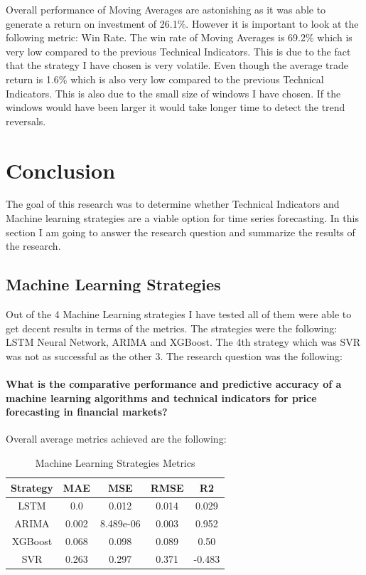 \documentclass{imc-inf}
\begin{document}
				Overall performance of Moving Averages are astonishing as it was able to generate a return on investment of 26.1\%. However it is important to look at the following 
				metric: Win Rate. The win rate of Moving Averages is 69.2\% which is very low compared to the previous Technical Indicators. This is due to the fact that the strategy I have 
				chosen is very volatile. Even though the average trade return is 1.6\% which is also very low compared to the previous Technical Indicators. This is also due to the small size 
				of windows I have chosen. If the windows would have been larger it would take longer time to detect the trend reversals.
	

\chapter{Conclusion}

	The goal of this research was to determine whether Technical Indicators and Machine learning strategies are a viable option for time series forecasting. In this section I am going to answer 
	the research question and summarize the results of the research.
	\section{Machine Learning Strategies}
		Out of the 4 Machine Learning strategies 
		I have tested all of them were able to get decent results in terms of the metrics. The strategies were the following: LSTM Neural Network, ARIMA and XGBoost. The 4th strategy which was SVR was 
		not as successful as the other 3.
		The research question was the following:
		\subsubsection{
			What is the comparative performance and predictive accuracy of a machine learning
			algorithms and technical indicators for price forecasting in financial markets?
			} 


		Overall average metrics achieved are the following:
		\begin{table}[h!]
			\centering
			\begin{tabular}{|c|c|c|c|c|}
					\hline
					\textbf{Strategy} &		\textbf{MAE} & \textbf{MSE} & \textbf{RMSE} & \textbf{R2} \\ \hline
					LSTM             				 & 0.0 & 0.012 & 0.014 & 0.029  \\ \hline
					ARIMA            				 & 0.002 & 8.489e-06  & 0.003 & 0.952 \\ \hline
					XGBoost      	 				 &  0.068 & 0.098 &  0.089 &  0.50 \\ \hline
					SVR        		 				 & 0.263 & 0.297 & 0.371 & -0.483 \\ \hline
				
			\end{tabular}
			\caption{Machine Learning Strategies Metrics}
			\label{tab:machine_learning_strategies_metrics}
		\end{table}
\end{document}
